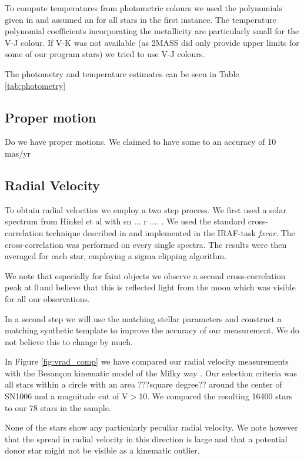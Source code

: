 To compute temperatures from photometric colours we used the polynomials given in  \citep{2010A&A...512A..54C} and assumed an  for all stars in the first instance. The temperature polynomial coefficients incorporating the metallicity are particularly small for the V-J colour. If V-K was not available (as 2MASS did only provide upper limits for some of our program stars) we tried to use V-J colours. 

The photometry and temperature estimates can be seen in Table \ref{tab:photometry}
\subsection{Proper motion}
Do we have proper motions. We claimed to have some to an accuracy of 10 mas/yr

\subsection{Radial Velocity}

To obtain radial velocities we employ a two step process. We first used a solar spectrum from Hinkel et al with sn ... r .... . 
We used the standard cross-correlation technique described in \citep{1979AJ.....84.1511T} and implemented in the IRAF-task \textit{fxcor}. The cross-correlation was performed on every single spectra. The results were then averaged for each star, employing a sigma clipping algorithm. 

We note that especially for faint objects we observe a second cross-correlation peak at 0\,\kms and believe that this is reflected light from the moon which was visible for all our observations. 

In a second step we will use the matching stellar parameters and construct a matching synthetic template to improve the accuracy of our measurement. We do not believe this to change by much. 

In Figure \ref{fig:vrad_comp} we have compared our radial velocity measurements with the Besan\c{c}on kinematic model of the Milky way \citep{2003A&A...409..523R}. Our selection criteria was all stars within a circle with an area ???square degree?? around the center of SN1006 and a magnitude cut of V$>$10. We compared the resulting 16400 stars to our 78 stars in the sample. 
 
None of the stars show any particularly peculiar radial velocity. We note however that the spread in radial velocity in this direction is large and that a potential donor star might not be visible as a kinematic outlier. 

